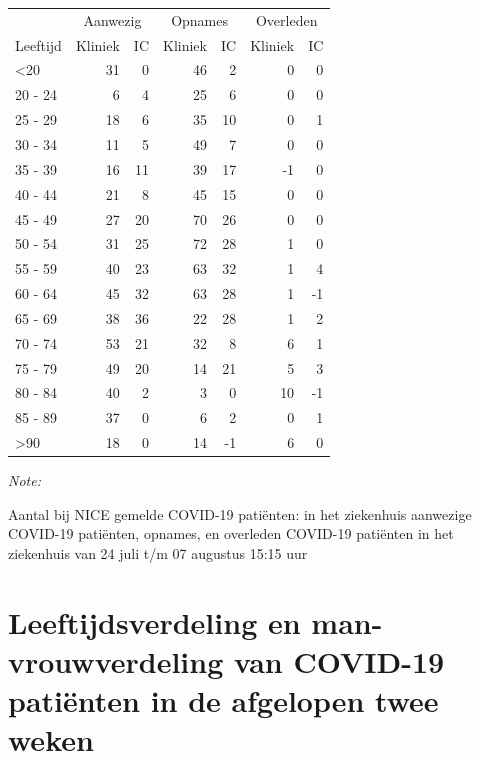 \documentclass[
  english,
  man,floatsintext]{apa6}
\begin{document}
\begin{table}
\centering\begingroup\fontsize{10}{12}\selectfont

\begin{threeparttable}
\begin{tabular}{lrrrrrr}
\toprule
\multicolumn{1}{c}{ } & \multicolumn{2}{c}{Aanwezig} & \multicolumn{2}{c}{Opnames} & \multicolumn{2}{c}{Overleden} \\
\cmidrule(l{3pt}r{3pt}){2-3} \cmidrule(l{3pt}r{3pt}){4-5} \cmidrule(l{3pt}r{3pt}){6-7}
Leeftijd & Kliniek & IC & Kliniek & IC & Kliniek & IC\\
\midrule
<20 & 31 & 0 & 46 & 2 & 0 & 0\\
20 - 24 & 6 & 4 & 25 & 6 & 0 & 0\\
25 - 29 & 18 & 6 & 35 & 10 & 0 & 1\\
30 - 34 & 11 & 5 & 49 & 7 & 0 & 0\\
35 - 39 & 16 & 11 & 39 & 17 & -1 & 0\\
40 - 44 & 21 & 8 & 45 & 15 & 0 & 0\\
45 - 49 & 27 & 20 & 70 & 26 & 0 & 0\\
50 - 54 & 31 & 25 & 72 & 28 & 1 & 0\\
55 - 59 & 40 & 23 & 63 & 32 & 1 & 4\\
60 - 64 & 45 & 32 & 63 & 28 & 1 & -1\\
65 - 69 & 38 & 36 & 22 & 28 & 1 & 2\\
70 - 74 & 53 & 21 & 32 & 8 & 6 & 1\\
75 - 79 & 49 & 20 & 14 & 21 & 5 & 3\\
80 - 84 & 40 & 2 & 3 & 0 & 10 & -1\\
85 - 89 & 37 & 0 & 6 & 2 & 0 & 1\\
>90 & 18 & 0 & 14 & -1 & 6 & 0\\
\bottomrule
\end{tabular}
\begin{tablenotes}
\item \textit{Note: } 
\item Aantal bij NICE gemelde COVID-19 patiënten: in het ziekenhuis aanwezige COVID-19 patiënten, opnames, en overleden COVID-19 patiënten in het ziekenhuis van 24 juli t/m 07 augustus 15:15 uur
\end{tablenotes}
\end{threeparttable}
\endgroup{}
\end{table}

\newpage

\hypertarget{leeftijdsverdeling-en-man-vrouwverdeling-van-covid-19-patiuxebnten-in-de-afgelopen-twee-weken}{%
\section{Leeftijdsverdeling en man-vrouwverdeling van COVID-19 patiënten in de afgelopen twee weken}\label{leeftijdsverdeling-en-man-vrouwverdeling-van-covid-19-patiuxebnten-in-de-afgelopen-twee-weken}}
\end{document}
